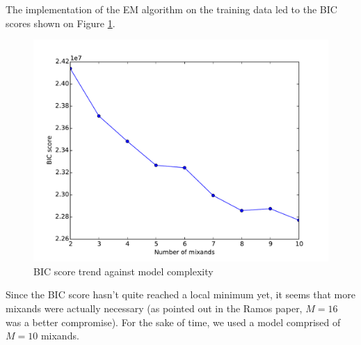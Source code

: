 The implementation of the EM algorithm on the training data led to the BIC scores shown on Figure \ref{fig:bic}.
\begin{figure}[tb]
\centering
\includegraphics[scale=0.5]{figures_partB/bic}
\caption{BIC score trend against model complexity }
\label{fig:bic}
\end{figure}
Since the BIC score hasn't quite reached a local minimum yet, it seems that more mixands were actually necessary (as pointed out in the Ramos paper, $M=16$ was a better compromise). For the sake of time, we used a model comprised of $M=10$ mixands. 






